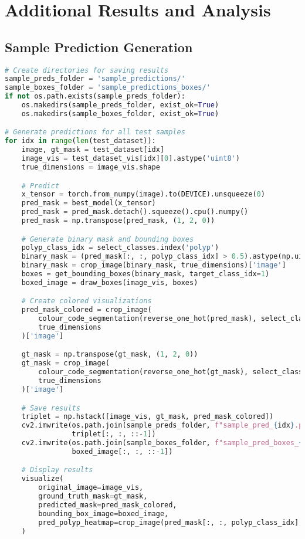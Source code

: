 \documentclass[12pt,a4paper]{report}
\begin{document}
\chapter{Additional Results and Analysis}

\section{Sample Prediction Generation}
\begin{lstlisting}[language=Python, caption=Batch Prediction Processing]
# Create directories for saving results
sample_preds_folder = 'sample_predictions/'
sample_boxes_folder = 'sample_predictions_boxes/'
if not os.path.exists(sample_preds_folder):
    os.makedirs(sample_preds_folder, exist_ok=True)
    os.makedirs(sample_boxes_folder, exist_ok=True)

# Generate predictions for all test samples
for idx in range(len(test_dataset)):
    image, gt_mask = test_dataset[idx]
    image_vis = test_dataset_vis[idx][0].astype('uint8')
    true_dimensions = image_vis.shape

    # Predict
    x_tensor = torch.from_numpy(image).to(DEVICE).unsqueeze(0)
    pred_mask = best_model(x_tensor)
    pred_mask = pred_mask.detach().squeeze().cpu().numpy()
    pred_mask = np.transpose(pred_mask, (1, 2, 0))

    # Generate binary mask and bounding boxes
    polyp_class_idx = select_classes.index('polyp')
    binary_mask = (pred_mask[:, :, polyp_class_idx] > 0.5).astype(np.uint8)
    binary_mask = crop_image(binary_mask, true_dimensions)['image']
    boxes = get_bounding_boxes(binary_mask, target_class_idx=1)
    boxed_image = draw_boxes(image_vis, boxes)

    # Create colored visualizations
    pred_mask_colored = crop_image(
        colour_code_segmentation(reverse_one_hot(pred_mask), select_class_rgb_values),
        true_dimensions
    )['image']

    gt_mask = np.transpose(gt_mask, (1, 2, 0))
    gt_mask = crop_image(
        colour_code_segmentation(reverse_one_hot(gt_mask), select_class_rgb_values),
        true_dimensions
    )['image']

    # Save results
    triplet = np.hstack([image_vis, gt_mask, pred_mask_colored])
    cv2.imwrite(os.path.join(sample_preds_folder, f"sample_pred_{idx}.png"), 
                triplet[:, :, ::-1])
    cv2.imwrite(os.path.join(sample_boxes_folder, f"sample_pred_boxes_{idx}.png"), 
                boxed_image[:, :, ::-1])

    # Display results
    visualize(
        original_image=image_vis,
        ground_truth_mask=gt_mask,
        predicted_mask=pred_mask_colored,
        bounding_box_image=boxed_image,
        pred_polyp_heatmap=crop_image(pred_mask[:, :, polyp_class_idx], true_dimensions)['image']
    )
\end{lstlisting}

\end{document}
